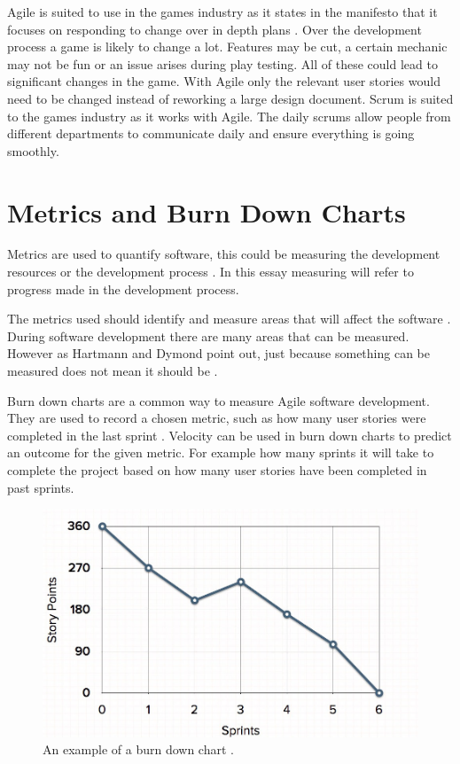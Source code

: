 \documentclass{scrartcl}
\begin{document}
Agile is suited to use in the games industry as it states in the manifesto that it focuses on responding to change over in depth plans \cite{AgileManifesto}.  Over the development process a game is likely to change a lot. Features may be cut, a certain mechanic may not be fun or an issue arises during play testing. All of these could lead to significant changes in the game. With Agile only the relevant user stories would need to be changed instead of reworking a large design document. Scrum is suited to the games industry as it works with Agile. The daily scrums allow people from different departments to communicate daily and ensure everything is going smoothly.

\section{Metrics and Burn Down Charts}

Metrics are used to quantify software, this could be measuring the development resources or the development process \cite{Misra}. In this essay measuring will refer to progress made in the development process. 

The metrics used should identify and measure areas that will affect the software \cite{Misra}.
During software development there are many areas that can be measured. However as Hartmann and Dymond point out, just because something can be measured does not mean it should be \cite{Hartmann}.

Burn down charts are a common way to measure Agile software development. They are used to record a chosen metric, such as how many user stories were completed in the last sprint \cite{AgileWithScrum}. Velocity can be used in burn down charts to predict an outcome for the given metric. For example how many sprints it will take to complete the project based on how many user stories have been completed in past sprints. %

\begin{figure}[h]
	\includegraphics[width=1.0\linewidth]{BDChart.jpg}
	\caption{ An example of a burn down chart \cite{MGS}.}
\end{figure}
\end{document}
